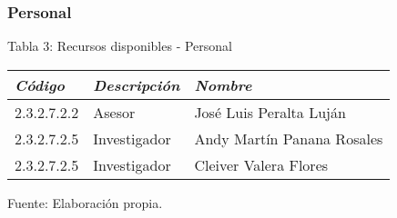     \subsubsection{Personal}
        \begin{table}[h!]
            \centering
            { Tabla 3: Recursos disponibles - Personal}\par
            \begin{tabular}{|p{3cm}|p{3cm}|p{5cm}|} \hline
                 
            
            \textit{{\bf{Código}}} &
            \textit{{\bf{Descripción}}} &
            \textit{{\bf{Nombre}}}
            \\ \hline

            2.3.2.7.2.2 &
            Asesor &
            José Luis Peralta Luján
            \\ \hline

            2.3.2.7.2.5 &
            Investigador &
            Andy Martín Panana Rosales
            \\ \hline

            2.3.2.7.2.5 &
            Investigador &
            Cleiver Valera Flores
            \\ \hline

            \end{tabular}
            \begin{center}
                \vskip -0.2cm
                {\small{Fuente: Elaboración propia.}}
            \end{center}
        \end{table}
